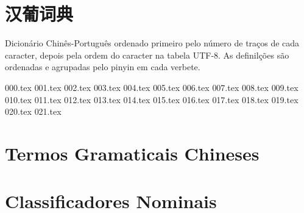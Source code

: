 \documentclass[a4paper,9pt,twoside,openany]{memoir}
\begin{document}



\clearpage
\pagestyle{empty}
\tableofcontents

\clearpage
\pagestyle{empty}
\chapter{汉葡词典}

%
%

Dicionário Chinês-Português ordenado primeiro pelo número de traços
de cada caracter, depois pela ordem do caracter na tabela UTF-8.
As definilções são ordenadas e agrupadas pelo pinyin em cada verbete.

\clearpage
\pagestyle{dicionario}
\begin{multicols}{2}
{000.tex}
{001.tex}
{002.tex}
{003.tex}
{004.tex}
{005.tex}
{006.tex}
{007.tex}
{008.tex}
{009.tex}
{010.tex}
{011.tex}
{012.tex}
{013.tex}
{014.tex}
{015.tex}
{016.tex}
{017.tex}
{018.tex}
{019.tex}
{020.tex}
{021.tex}
\end{multicols}

\clearpage
\pagestyle{plain}
\chapter{Termos Gramaticais Chineses}


\clearpage
\pagestyle{plain}
\chapter{Classificadores Nominais}

\end{document}
